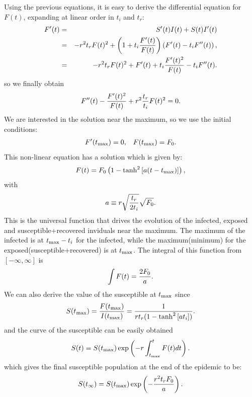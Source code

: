 \documentclass[a4paper,oneside,11pt]{article}
\begin{document}
 Using the previous equations, it is easy to derive the differential equation for $F(t)$, expanding at linear order in $t_i$ and $t_r$:
 \begin{eqnarray}
 F'(t)&=& S'(t)I(t) + S(t) I'(t)\nonumber\\
 & =& - r^2 t_r  F(t)^2 + \left(1+t_i {F'(t)\over F(t)}\right) \left(F'(t)  -t_i F''(t)\right),\nonumber\\
 & =& - r^2 t_r  F(t)^2  + F'(t)+t_i {F'(t)^2\over F(t)} -t_i F''(t).
 \end{eqnarray} 
 so we finally obtain
  \begin{eqnarray}
 F''(t) - {F'(t)^2\over F(t)} + r^2 {t_r\over t_i} F(t)^2 = 0.  
 \end{eqnarray}
 We are interested in the solution near the maximum, so we use the initial conditions:
 \begin{eqnarray}
 F'(t_{\rm max}) = 0, \;\;\; F(t_{\rm max}) = F_0.
 \end{eqnarray}
 This non-linear equation has a solution which is given by:
\begin{eqnarray}
F(t) = F_0 \left(1 - \tanh^2\left[ a (t-t_{\rm max})\right]\right),
\end{eqnarray} 
with 
\begin{eqnarray}
a\equiv r \sqrt{{t_r\over 2 t_i}} \sqrt{F_0}.
\end{eqnarray}
This is the universal function that drives the evolution of the infected, exposed and susceptible+recovered inviduals near the maximum. The maximum of the infected is at $t_{\rm max}-t_i$ for the infected, while the maximum(minimum) for the exposed(susceptible+recovered) is at $t_{\rm max}$. The integral of this function from $[-\infty, \infty]$ is
\begin{eqnarray}
\int F(t) = {2 F_0 \over a}.
\end{eqnarray}
We can also derive the value of the susceptible at $t_{\rm max}$ since
\begin{eqnarray}
S(t_{\rm max}) = {F(t_{\rm max}) \over I(t_{\rm max})} = {1  \over r t_r  (1- \tanh^2\left[ a t_i\right])}.
\end{eqnarray}
and the curve of the susceptible can be easily obtained 
\begin{eqnarray}
S(t) = S(t_{\rm max}) \exp \left(-r \int_{t_{\rm max}}^t F(t) dt \right).
\end{eqnarray}
which gives the final  susceptible population at the end of the epidemic to be:
\begin{eqnarray}
S(t_\infty) = S(t_{\rm max}) \exp\left(- {r^2 t_r F_0\over a}\right). 
\end{eqnarray}
\end{document}
